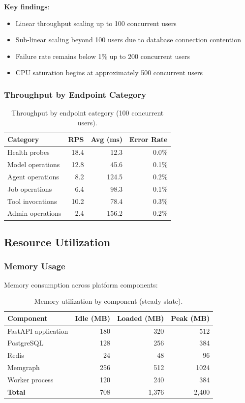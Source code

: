 \textbf{Key findings}:
\begin{itemize}
    \item Linear throughput scaling up to 100 concurrent users
    \item Sub-linear scaling beyond 100 users due to database connection contention
    \item Failure rate remains below 1\% up to 200 concurrent users
    \item CPU saturation begins at approximately 500 concurrent users
\end{itemize}

\subsubsection{Throughput by Endpoint Category}

\begin{table}[ht]
\centering
\caption{Throughput by endpoint category (100 concurrent users).}
\label{tab:throughput-by-category}
\small
\begin{tabular}{lrrr}
\hline
\textbf{Category} & \textbf{RPS} & \textbf{Avg (ms)} & \textbf{Error Rate} \\
\hline
Health probes & 18.4 & 12.3 & 0.0\% \\
Model operations & 12.8 & 45.6 & 0.1\% \\
Agent operations & 8.2 & 124.5 & 0.2\% \\
Job operations & 6.4 & 98.3 & 0.1\% \\
Tool invocations & 10.2 & 78.4 & 0.3\% \\
Admin operations & 2.4 & 156.2 & 0.2\% \\
\hline
\end{tabular}
\end{table}

\subsection{Resource Utilization}

\subsubsection{Memory Usage}

Memory consumption across platform components:

\begin{table}[ht]
\centering
\caption{Memory utilization by component (steady state).}
\label{tab:memory-usage}
\small
\begin{tabular}{lrrr}
\hline
\textbf{Component} & \textbf{Idle (MB)} & \textbf{Loaded (MB)} & \textbf{Peak (MB)} \\
\hline
FastAPI application & 180 & 320 & 512 \\
PostgreSQL & 128 & 256 & 384 \\
Redis & 24 & 48 & 96 \\
Memgraph & 256 & 512 & 1024 \\
Worker process & 120 & 240 & 384 \\
\hline
\textbf{Total} & 708 & 1,376 & 2,400 \\
\hline
\end{tabular}
\end{table}

